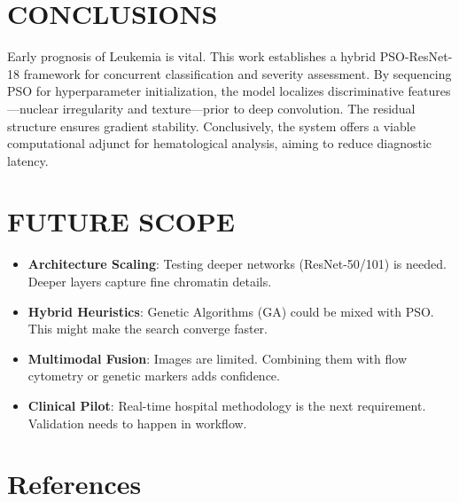 \documentclass[12pt,a4paper]{article}
\begin{document}
\section{CONCLUSIONS}
Early prognosis of Leukemia is vital. This work establishes a hybrid PSO-ResNet-18 framework for concurrent classification and severity assessment. By sequencing PSO for hyperparameter initialization, the model localizes discriminative features—nuclear irregularity and texture—prior to deep convolution. The residual structure ensures gradient stability. Conclusively, the system offers a viable computational adjunct for hematological analysis, aiming to reduce diagnostic latency.


\section{FUTURE SCOPE}
\begin{itemize}
    \item \textbf{Architecture Scaling}: Testing deeper networks (ResNet-50/101) is needed. Deeper layers capture fine chromatin details.
    \item \textbf{Hybrid Heuristics}: Genetic Algorithms (GA) could be mixed with PSO. This might make the search converge faster.
    \item \textbf{Multimodal Fusion}: Images are limited. Combining them with flow cytometry or genetic markers adds confidence.
    \item \textbf{Clinical Pilot}: Real-time hospital methodology is the next requirement. Validation needs to happen in workflow.
\end{itemize}
\section*{References}
\end{document}

